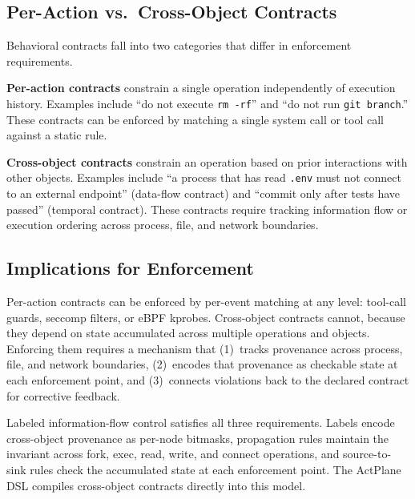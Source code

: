 \subsection{Per-Action vs.\ Cross-Object Contracts}

Behavioral contracts fall into two categories that differ in enforcement
requirements.

\textbf{Per-action contracts} constrain a single operation independently of
execution history. Examples include ``do not execute \texttt{rm~-rf}'' and
``do not run \texttt{git branch}.'' These contracts can be enforced by
matching a single system call or tool call against a static rule.

\textbf{Cross-object contracts} constrain an operation based on prior
interactions with other objects. Examples include ``a process that has read
\texttt{.env} must not connect to an external endpoint'' (data-flow
contract) and ``commit only after tests have passed'' (temporal contract).
These contracts require tracking information flow or execution ordering
across process, file, and network boundaries.


\subsection{Implications for Enforcement}

Per-action contracts can be enforced by per-event matching at any level:
tool-call guards, seccomp filters, or eBPF kprobes. Cross-object contracts
cannot, because they depend on state accumulated across multiple operations
and objects. Enforcing them requires a mechanism that (1)~tracks provenance
across process, file, and network boundaries, (2)~encodes that provenance
as checkable state at each enforcement point, and (3)~connects violations
back to the declared contract for corrective feedback.

Labeled information-flow control satisfies all three requirements. Labels
encode cross-object provenance as per-node bitmasks, propagation rules
maintain the invariant across fork, exec, read, write, and connect
operations, and source-to-sink rules check the accumulated state at each
enforcement point. The ActPlane DSL compiles cross-object contracts
directly into this model.
